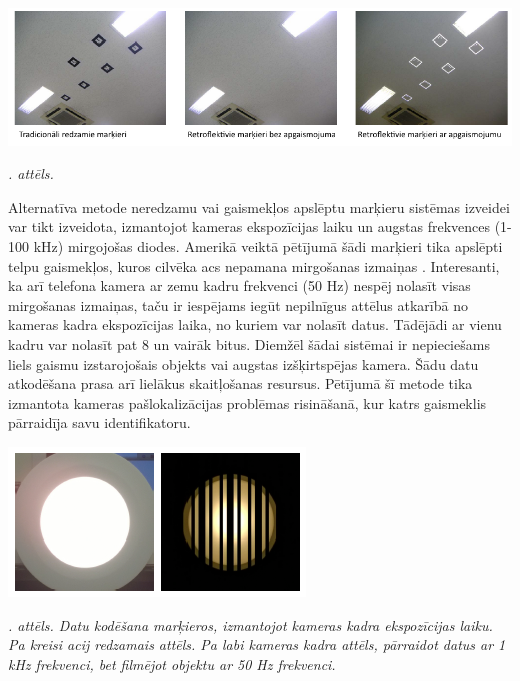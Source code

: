 \documentclass[12pt, a4paper, oneside, openright]{article}
\renewcommand{\thecimages}{\arabic{cimages}}
\begin{document}
\label{cimages:YusukeNakazato2004}
\vspace{10pt}
\begin{samepage}
\begin{center}
\includegraphics[width=0.8\columnwidth]{images/YusukeNakazato2004.png}
\begin{center}
\footnotesize{
\textit{\thecimages. attēls.}}
\end{center}
\end{center}
\end{samepage}

\par
Alternatīva metode neredzamu vai gaismekļos apslēptu marķieru sistēmas izveidei var tikt izveidota,
izmantojot kameras ekspozīcijas laiku un augstas frekvences (1-100 kHz) mirgojošas diodes. 
Amerikā veiktā pētījumā šādi marķieri tika apslēpti telpu gaismekļos, kuros cilvēka acs nepamana
mirgošanas izmaiņas \cite{Ye-ShengKuo2014}. Interesanti, ka arī telefona kamera ar zemu kadru frekvenci (50 Hz) nespēj
nolasīt visas mirgošanas izmaiņas, taču ir iespējams iegūt nepilnīgus attēlus atkarībā no
kameras kadra ekspozīcijas laika, no kuriem var nolasīt datus. Tādējādi ar vienu kadru var nolasīt
pat 8 un vairāk bitus. Diemžēl šādai sistēmai ir nepieciešams liels gaismu izstarojošais objekts 
vai augstas izšķirtspējas kamera. Šādu datu atkodēšana prasa arī lielākus skaitļošanas resursus. 
Pētījumā šī metode tika izmantota kameras pašlokalizācijas problēmas risināšanā, kur katrs gaismeklis
pārraidīja savu identifikatoru.

\label{cimages:ShengKuo2014_1}
\vspace{10pt}
\begin{samepage}
\begin{center}
\includegraphics[width=0.5\columnwidth]{images/ShengKuo2014_1.png}
\begin{center}
\footnotesize{
\textit{\thecimages. attēls. Datu kodēšana marķieros, izmantojot kameras kadra ekspozīcijas laiku. Pa kreisi acij redzamais attēls. Pa labi kameras kadra attēls, pārraidot datus ar 1 kHz frekvenci, bet filmējot objektu ar 50 Hz frekvenci.}}
\end{center}
\end{center}
\end{samepage}
\end{document}

